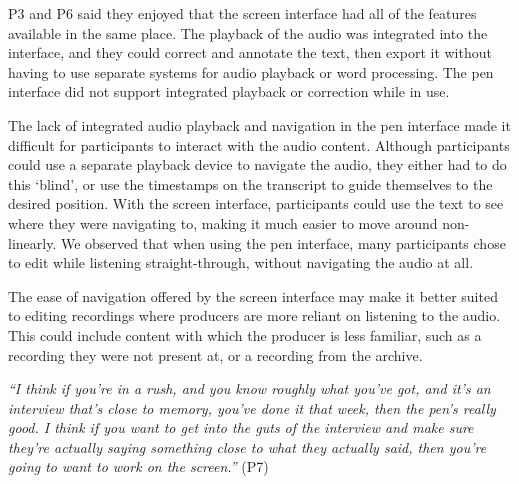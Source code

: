 P3 and P6 said they enjoyed that the screen interface had all of the features available in the same place. The playback
of the audio was integrated into the interface, and they could correct and annotate the text, then export it without
having to use separate systems for audio playback or word processing. The pen interface did not support integrated
playback or correction while in use.

The lack of integrated audio playback and navigation in the pen interface made it difficult for participants to
interact with the audio content.  Although participants could use a separate playback device to navigate the audio,
they either had to do this `blind', or use the timestamps on the transcript to guide themselves to the desired
position. With the screen interface, participants could use the text to see where they were navigating to, making it
much easier to move around non-linearly.  We observed that when using the pen interface, many participants chose to
edit while listening straight-through, without navigating the audio at all.

The ease of navigation offered by the screen interface may make it better suited to editing recordings where producers
are more reliant on listening to the audio. This could include content with which the producer is less familiar, such
as a recording they were not present at, or a recording from the archive.

\textit{``I think if you're in a rush, and you know roughly what you've got, and it's an interview that's close to
  memory, you've done it that week, then the pen's really good. I think if you want to get into the guts of the interview
  and make sure they're actually saying something close to what they actually said, then you're going to want to work on
the screen.''} (P7)




